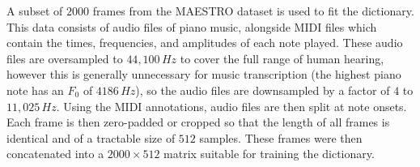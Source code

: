 A subset of $2000$ frames from the MAESTRO dataset\cite{hawthorne_enabling_2019} is used to fit the dictionary. This data consists of audio files of piano music, alongside \ac{MIDI} files which contain the times, frequencies, and amplitudes of each note played. These audio files are oversampled to $44,100\,Hz$  to cover the full range of human hearing, however this is  generally unnecessary for music transcription (the highest piano note has an $F_0$ of $4186\,Hz$), so the audio files are downsampled by a factor of $4$ to $11,025\,Hz$. Using the \ac{MIDI} annotations, audio files are then split at note onsets. Each frame is then zero-padded or cropped so that the length of all frames is identical and of a tractable size of $512$ samples. These frames were then concatenated into a $2000\times 512$ matrix suitable for training the dictionary.
